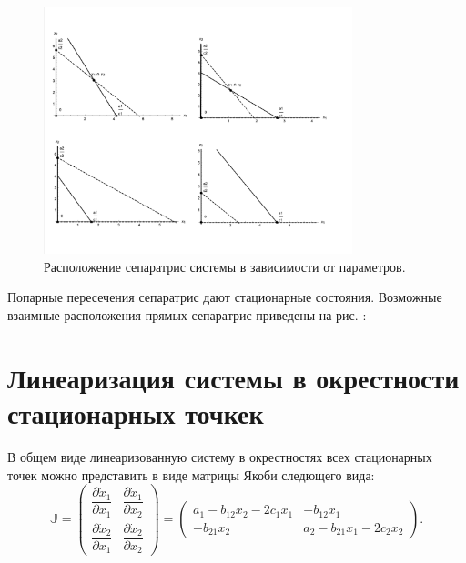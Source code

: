 \documentclass[12pt,a4paper]{article}
\begin{document}
    \begin{figure}[h!]
        \centering
        \includegraphics[width=0.8\textwidth]{separatrises.pdf}
        \caption{Расположение сепаратрис системы в зависимости от параметров.}
        \label{fig:seps}
    \end{figure}

    Попарные пересечения сепаратрис дают стационарные состояния. Возможные взаимные расположения прямых-сепаратрис приведены на рис. :

    \section{Линеаризация системы в окрестности стационарных точкек}
    В общем виде линеаризованную систему в окрестностях всех стационарных точек можно представить в виде матрицы Якоби следющего вида: 
    \begin{equation}
        \label{jacobian}
        \mathbb{J} = 
            \begin{pmatrix}
                \dfrac{\partial{\dot x_1}}{\partial x_1}
                &
                \dfrac{\partial{\dot x_1}}{\partial x_2}
                \\[5mm]
                \dfrac{\partial{\dot x_2}}{\partial x_1}
                &
                \dfrac{\partial{\dot x_2}}{\partial x_2}
            \end{pmatrix}
        =
            \begin{pmatrix}
                a_1 - b_{12} x_2 - 2 c_1 x_1 & -b_{12} x_1
                \\
                -b_{21} x_2 & a_2 - b_{21} x_1 - 2c_2 x_2
            \end{pmatrix}\!.
    \end{equation}
\end{document}
